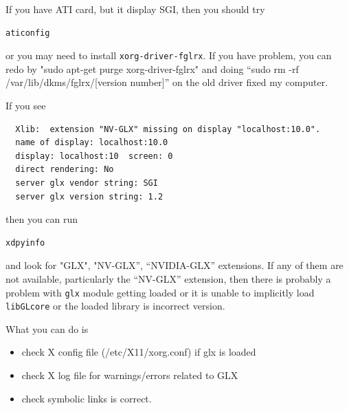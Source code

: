 If you have ATI card, but it display SGI, then you should try
\begin{verbatim}
aticonfig
\end{verbatim}
or you may need to install \verb!xorg-driver-fglrx!. If you have
problem, you can redo by "sudo apt-get purge xorg-driver-fglrx" and
doing ``sudo rm -rf /var/lib/dkms/fglrx/[version number]'' on the old
driver fixed my computer.

\renewcommand{\FancyVerbFormatLine}[1]{%
  \ifnum\value{FancyVerbLine}=4\color{red}#1%
  \else\color{blue}#1\fi}

If you see
\begin{Verbatim}
  Xlib:  extension "NV-GLX" missing on display "localhost:10.0".
  name of display: localhost:10.0
  display: localhost:10  screen: 0
  direct rendering: No
  server glx vendor string: SGI
  server glx version string: 1.2
\end{Verbatim}
then you can run 
\begin{verbatim}
xdpyinfo
\end{verbatim}
and look for "GLX", "NV-GLX'', ``NVIDIA-GLX'' extensions. If any of
them are not available, particularly the ``NV-GLX'' extension, then
there is probably a problem with \verb!glx! module getting loaded or
it is unable to implicitly load \verb!libGLcore! or the loaded library
is incorrect version. 

What you can do is
\begin{itemize}
\item check X config file (/etc/X11/xorg.conf) if glx is loaded
\item check X log file for warnings/errors related to GLX
\item check symbolic links is correct.
\end{itemize}


